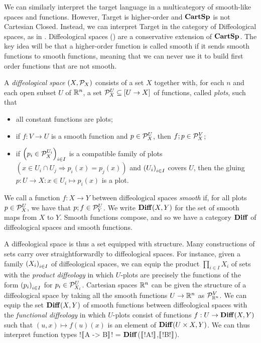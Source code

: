 We can similarly interpret the target language in a multicategory of smooth-like spaces and functions. 
However, Target is higher-order and $\CartSp$ is not Cartesian Closed. 
Instead, we can interpret Target in the category of Diffeological spaces, 
as in \cite{huot2020correctness}. 
Diffeological spaces (\cite{iglesias2013diffeology}) are a conservative extension of $\CartSp$. 
The key idea will be that a higher-order function is called smooth if it sends smooth functions to smooth functions, meaning that we can never use it
to build first order functions that are not smooth.

\begin{definition}
	A \emph{diffeological space} $(X,\plots{X})$ consists of a set $X$ together with, for each $n$ and each open subset $U$ of $\RR^n$,  a set $\plots{X}^U\subseteq [U\to X]$ of functions, called \emph{plots}, such that
	\begin{itemize}
	 	\item all constant functions are plots;
	 	\item if $f:V\to U$ is a smooth function and $p\in\plots{X}^U$, then $f;p\in\plots{X}^V$;
     \item if $\seq[i\in I]{p_i\in\plots{X}^{U_i}}$ is a compatible family of plots $(x\in U_i\cap U_j\Rightarrow p_i(x)=p_j(x))$
     and $\seq[i\in I]{U_i}$ covers $U$,
     then the gluing $p:U\to X:x\in U_i\mapsto p_i(x)$ is a plot.
	 \end{itemize} 
\end{definition}
We call a function $f:X\to Y$ between diffeological spaces \emph{smooth} if, for all plots
$p\in\plots{X}^U$, we have that $p;f\in \plots{Y}^U$. We write $\Diff(X,Y)$ for the set of smooth maps from $X$ to $Y$. 
Smooth functions compose, and so we have a category $\Diff$ of diffeological spaces and smooth functions.

A diffeological space is thus a set equipped with structure.
Many constructions of sets carry over straightforwardly to diffeological spaces.
For instance, given a family $\seq[i\in I]{X_i}$ of diffeological spaces,
we can equip the product $\prod_{i\in I}X_i$ of sets with the
\emph{product diffeology} in which $U$-plots are precisely the functions
of the form $\seq[i\in I]{p_i}$ for $p_i\in\plots{X_i}^U$.  
Cartesian spaces $\RR^n$ can be given the structure of a diffeological space by taking all the
smooth functions $U\to \RR^n$ as $\plots{\RR^n}^V$. We can equip the set $\Diff(X,Y)$ of smooth functions between diffeological spaces with the \emph{functional diffeology}
in which $U$-plots consist of functions $f:U\to \Diff(X,Y)$ such that 
$(u,x)\mapsto f(u)(x)$ is an element of $\Diff(U\times X, Y)$.
We can thus interpret function types !$\seml$A -> B$\semr$! = $\Diff$($\seml$!A!$\semr$,$\seml$!B!$\semr$).

